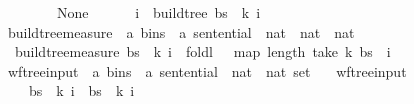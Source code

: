 \begin{isabellebody}
\ \ \ \ \ \ {\isacharbrackleft}{\kern0pt}{\isacharbrackright}{\kern0pt}\ {\isasymRightarrow}\ None\isanewline
\ \ \ \ {\isacharbar}{\kern0pt}\ {\isacharparenleft}{\kern0pt}{\isacharunderscore}{\kern0pt}{\isacharcomma}{\kern0pt}\ i{\isacharparenright}{\kern0pt}{\isacharhash}{\kern0pt}{\isacharunderscore}{\kern0pt}\ {\isasymRightarrow}\ build{\isacharunderscore}{\kern0pt}tree{\isacharprime}{\kern0pt}\ bs\ {\isasymomega}\ k\ i{\isacharparenright}{\kern0pt}{\isachardoublequoteclose}%
\isadelimdocument
%
\endisadelimdocument
%
\isatagdocument
%
\isamarkuptrue%
%
\endisatagdocument
{\isafolddocument}%
%
\isadelimdocument
%
\endisadelimdocument
{}\isamarkupfalse%
\ build{\isacharunderscore}{\kern0pt}tree{\isacharprime}{\kern0pt}{\isacharunderscore}{\kern0pt}measure\ {\isacharcolon}{\kern0pt}{\isacharcolon}{\kern0pt}\ {\isachardoublequoteopen}{\isacharparenleft}{\kern0pt}{\isacharprime}{\kern0pt}a\ bins\ {\isasymtimes}\ {\isacharprime}{\kern0pt}a\ sentential\ {\isasymtimes}\ nat\ {\isasymtimes}\ nat{\isacharparenright}{\kern0pt}\ {\isasymRightarrow}\ nat{\isachardoublequoteclose}\ \isanewline
\ \ {\isachardoublequoteopen}build{\isacharunderscore}{\kern0pt}tree{\isacharprime}{\kern0pt}{\isacharunderscore}{\kern0pt}measure\ {\isacharparenleft}{\kern0pt}bs{\isacharcomma}{\kern0pt}\ {\isasymomega}{\isacharcomma}{\kern0pt}\ k{\isacharcomma}{\kern0pt}\ i{\isacharparenright}{\kern0pt}\ {\isacharequal}{\kern0pt}\ foldl\ {\isacharparenleft}{\kern0pt}{\isacharplus}{\kern0pt}{\isacharparenright}{\kern0pt}\ {}\ {\isacharparenleft}{\kern0pt}map\ length\ {\isacharparenleft}{\kern0pt}take\ k\ bs{\isacharparenright}{\kern0pt}{\isacharparenright}{\kern0pt}\ {\isacharplus}{\kern0pt}\ i{\isachardoublequoteclose}\isanewline
\isanewline
{}\isamarkupfalse%
\ wf{\isacharunderscore}{\kern0pt}tree{\isacharunderscore}{\kern0pt}input\ {\isacharcolon}{\kern0pt}{\isacharcolon}{\kern0pt}\ {\isachardoublequoteopen}{\isacharparenleft}{\kern0pt}{\isacharprime}{\kern0pt}a\ bins\ {\isasymtimes}\ {\isacharprime}{\kern0pt}a\ sentential\ {\isasymtimes}\ nat\ {\isasymtimes}\ nat{\isacharparenright}{\kern0pt}\ set{\isachardoublequoteclose}\ \isanewline
\ \ {\isachardoublequoteopen}wf{\isacharunderscore}{\kern0pt}tree{\isacharunderscore}{\kern0pt}input\ {\isacharequal}{\kern0pt}\ {\isacharbraceleft}{\kern0pt}\isanewline
\ \ \ \ {\isacharparenleft}{\kern0pt}bs{\isacharcomma}{\kern0pt}\ {\isasymomega}{\isacharcomma}{\kern0pt}\ k{\isacharcomma}{\kern0pt}\ i{\isacharparenright}{\kern0pt}\ {\isacharbar}{\kern0pt}\ bs\ {\isasymomega}\ k\ i{\isachardot}{\kern0pt}\isanewline

\end{isabellebody}
